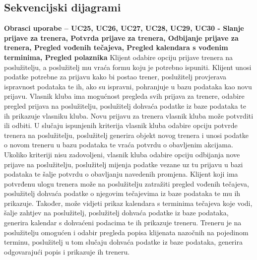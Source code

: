 		
				
			\subsection{Sekvencijski dijagrami}
				\noindent \textbf {Obrasci uporabe – UC25, UC26, UC27, UC28, UC29, UC30 - Slanje prijave za trenera, Potvrda prijave za trenera, Odbijanje prijave za trenera, Pregled vođenih tečajeva, Pregled kalendara s vođenim terminima, Pregled polaznika}
Klijent odabire opciju prijave trenera na poslužitelju, a poslužitelj mu vraća formu koju je potrebno ispuniti. Klijent unosi podatke potrebne za prijavu kako bi postao trener, poslužitelj provjerava ispravnost podataka te ih, ako su ispravni, pohranjuje u bazu podataka kao novu prijavu. Vlasnik kluba ima mogućnost pregleda svih prijava za trenere, odabire pregled prijava na poslužitelju, poslužitelj dohvaća podatke iz baze podataka te ih prikazuje vlasniku kluba. Novu prijavu za trenera vlasnik kluba može potvrditi ili odbiti. U slučaju ispunjenih kriterija vlasnik kluba odabire opciju potvrde trenera na poslužitelju, poslužitelj generira objekt novog trenera i unosi podatke o novom treneru u bazu podataka te vraća potvrdu o obavljenim akcijama. Ukoliko kriteriji nisu zadovoljeni, vlasnik kluba odabire opciju odbijanja nove prijave na poslužitelju, poslužitelj mijenja podatke vezane uz tu prijavu u bazi podataka te šalje potvrdu o obavljanju navedenih promjena.  Klijent koji ima potvrđenu ulogu trenera može na poslužitelju zatražiti pregled vođenih tečajeva, poslužitelj dohvaća podatke o njegovim tečajevima iz baze podataka te mu ih prikazuje. Također, može vidjeti prikaz kalendara s terminima tečajeva koje vodi, šalje zahtjev na poslužitelj, poslužitelj dohvaća podatke iz baze podataka, generira kalendar s dohvaćeni podacima te ih prikazuje treneru. Treneru je na poslužitelju omogućen i odabir pregleda popisa klijenata nazočnih na pojedinom terminu, poslužitelj u tom slučaju dohvaća podatke iz baze podataka, generira odgovarajući popis i prikazuje ih treneru. 
				
